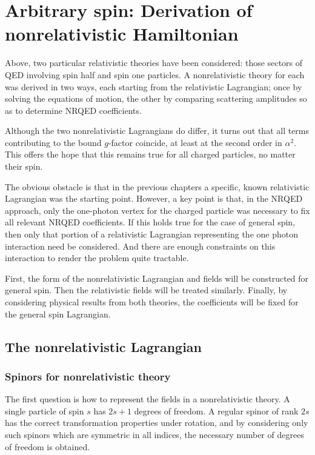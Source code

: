 
\chapter{Arbitrary spin: Derivation of nonrelativistic Hamiltonian}

Above, two particular relativistic theories have been considered: those sectors of QED involving spin half and spin one particles.  A nonrelativistic theory for each was derived in two ways, each starting from the relativistic Lagrangian; once by solving the equations of motion, the other by comparing scattering amplitudes so as to determine NRQED coefficients.

Although the two nonrelativistic Lagrangians do differ, it turns out that all terms contributing to the bound $g$-factor coincide, at least at the second order in $\alpha^2$.  This offers the hope that this remains true for all charged particles, no matter their spin.

The obvious obstacle is that in the previous chapters a specific, known relativistic Lagrangian was the starting point.  However, a key point is that, in the NRQED approach, only the one-photon vertex for the charged particle was necessary to fix all relevant NRQED coefficients.  If this holds true for the case of general spin, then only that portion of a relativistic Lagrangian representing the one photon interaction need be considered.  And there are enough constraints on this interaction to render the problem quite tractable.

First, the form of the nonrelativistic Lagrangian and fields will be constructed for general spin.  Then the relativistic fields will be treated similarly.  Finally, by considering physical results from both theories, the coefficients will be fixed for the general spin Lagrangian.



\section{The nonrelativistic Lagrangian}
\subsection{Spinors for nonrelativistic theory}
The first question is how to represent the fields in a nonrelativistic theory.  A single particle of spin $s$ has $2s+1$ degrees of freedom.  A regular spinor of rank $2s$ has the correct transformation properties under rotation, and by considering only such spinors which are symmetric in all indices, the necessary number of degrees of freedom is obtained.


